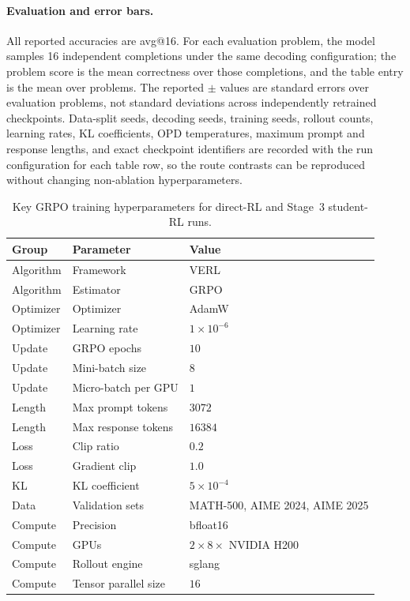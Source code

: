 \documentclass{article}
\begin{document}
\paragraph{Evaluation and error bars.} All reported accuracies are avg@16. For each evaluation problem, the model samples 16 independent completions under the same decoding configuration; the problem score is the mean correctness over those completions, and the table entry is the mean over problems. The reported $\pm$ values are standard errors over evaluation problems, not standard deviations across independently retrained checkpoints. Data-split seeds, decoding seeds, training seeds, rollout counts, learning rates, KL coefficients, OPD temperatures, maximum prompt and response lengths, and exact checkpoint identifiers are recorded with the run configuration for each table row, so the route contrasts can be reproduced without changing non-ablation hyperparameters.

\begin{table}[!ht]
\caption{Key GRPO training hyperparameters for direct-RL and Stage~3 student-RL runs.}
\label{tab:grpo-hyperparameters}
\centering
\begingroup
\setlength{\tabcolsep}{5pt}
\footnotesize
\begin{tabular}{@{}lll@{}}
\toprule
Group & Parameter & Value \\
\midrule
Algorithm & Framework & VERL \\
Algorithm & Estimator & GRPO \\
Optimizer & Optimizer & AdamW \\
Optimizer & Learning rate & $1\times10^{-6}$ \\
Update & GRPO epochs & $10$ \\
Update & Mini-batch size & $8$ \\
Update & Micro-batch per GPU & $1$ \\
Length & Max prompt tokens & $3072$ \\
Length & Max response tokens & $16384$ \\
Loss & Clip ratio & $0.2$ \\
Loss & Gradient clip & $1.0$ \\
KL & KL coefficient & $5\times10^{-4}$ \\
Data & Validation sets & MATH-500, AIME 2024, AIME 2025 \\
Compute & Precision & bfloat16 \\
Compute & GPUs & $2\times 8 \times$ NVIDIA H200 \\
Compute & Rollout engine & sglang \\
Compute & Tensor parallel size & $16$ \\
\bottomrule
\end{tabular}
\endgroup
\end{table}
\end{document}
